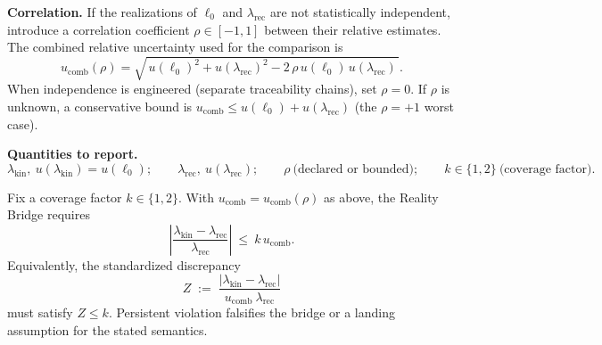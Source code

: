 \documentclass[11pt]{article}
\begin{document}
\medskip
\noindent\textbf{Correlation.} If the realizations of \(\ell_{0}\) and \(\lambda_{\mathrm{rec}}\) are not statistically independent, introduce a correlation coefficient \(\rho\in[-1,1]\) between their relative estimates. The combined relative uncertainty used for the comparison is
\[
u_{\mathrm{comb}}(\rho)
=\sqrt{\,u(\ell_{0})^{2}+u(\lambda_{\mathrm{rec}})^{2}-2\,\rho\,u(\ell_{0})\,u(\lambda_{\mathrm{rec}})\,}.
\]
When independence is engineered (separate traceability chains), set \(\rho=0\). If \(\rho\) is unknown, a conservative bound is \(u_{\mathrm{comb}}\le u(\ell_{0})+u(\lambda_{\mathrm{rec}})\) (the \(\rho=+1\) worst case).

\medskip
\noindent\textbf{Quantities to report.}
\[
\lambda_{\mathrm{kin}},\ u(\lambda_{\mathrm{kin}})=u(\ell_{0});\qquad
\lambda_{\mathrm{rec}},\ u(\lambda_{\mathrm{rec}});\qquad
\rho\ \text{(declared or bounded)};\qquad
k\in\{1,2\}\ \text{(coverage factor)}.
\]

\begin{theorem}
Fix a coverage factor \(k\in\{1,2\}\). With \(u_{\mathrm{comb}}=u_{\mathrm{comb}}(\rho)\) as above, the Reality Bridge requires
\[
\left|\frac{\lambda_{\mathrm{kin}}-\lambda_{\mathrm{rec}}}{\lambda_{\mathrm{rec}}}\right|
\ \le\ 
k\,u_{\mathrm{comb}}.
\]
Equivalently, the standardized discrepancy
\[
Z\;:=\;\frac{|\lambda_{\mathrm{kin}}-\lambda_{\mathrm{rec}}|}{u_{\mathrm{comb}}\ \lambda_{\mathrm{rec}}}
\]
must satisfy \(Z\le k\). Persistent violation falsifies the bridge or a landing assumption for the stated semantics.
\end{theorem}
\end{document}
